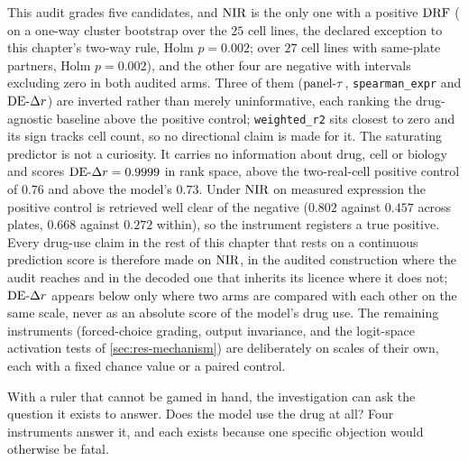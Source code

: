 \begin{claim}
This audit grades five candidates, and $\textrm{NIR}$ is the only
one with a positive $\textrm{DRF}$ ( on a one-way cluster
bootstrap over the $25$ cell lines, the declared exception to this chapter's
two-way rule, Holm $p = 0.002$;  over $27$ cell lines
with same-plate partners, Holm $p = 0.002$), and the other four are negative with
intervals excluding zero in both audited arms. Three of them ($\textrm{panel-}\tau$,
\texttt{spearman\_expr} and $\textrm{DE-}\Delta r$) are inverted rather than merely
uninformative, each ranking the drug-agnostic baseline above the positive
control; \texttt{weighted\_r2} sits closest to zero and its sign tracks cell
count, so no directional claim is made for it. The saturating predictor is not a
curiosity. It carries no information about drug, cell or biology and scores
$\textrm{DE-}\Delta r = 0.9999$ in rank space, above the two-real-cell positive control of
$0.76$ and above the model's $0.73$. Under $\textrm{NIR}$ on measured expression the positive control is retrieved well clear of
the negative ($0.802$ against $0.457$ across plates, $0.668$ against $0.272$
within), so the instrument registers a true positive. Every drug-use claim in
the rest of this chapter that rests on a continuous prediction score is
therefore made on $\textrm{NIR}$, in the audited construction where the audit reaches
and in the decoded one that inherits its licence where it does not; $\textrm{DE-}\Delta r$
appears below only where two arms are compared with each other on the same
scale, never as an absolute score of the model's drug use. The remaining instruments (forced-choice grading,
output invariance, and the logit-space activation tests of
\cref{sec:res-mechanism}) are deliberately on scales of their own, each with a
fixed chance value or a paired control.
\end{claim}


\label{sec:methods-controls}   %


\begin{question}[2]
With a ruler that cannot be gamed in hand, the investigation can ask the
question it exists to answer. Does the model use the drug at all? Four
instruments answer it, and each exists because one specific objection would
otherwise be fatal.
\end{question}

